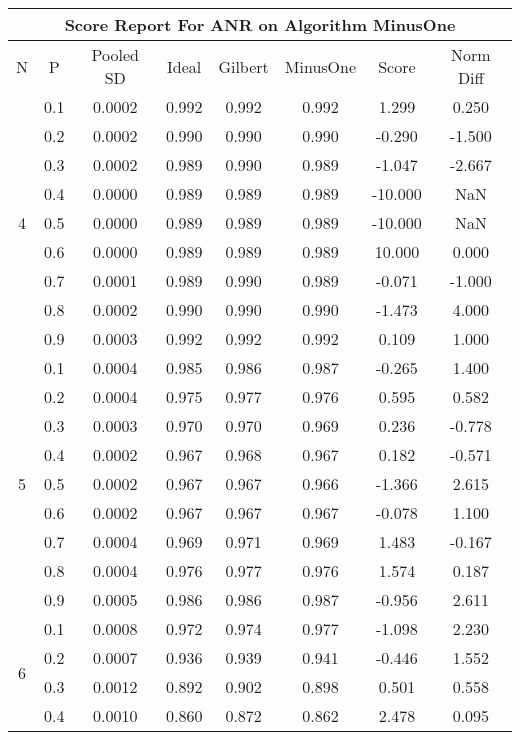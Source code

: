 \documentclass[11pt,a4paper]{report}
\begin{document}
\begin{longtable}{ | c | c || c | c | c | c | c | c | }
\hline
\multicolumn{8}{|c|}{ Score Report For ANR on Algorithm MinusOne} \\
\hline
N & P & Pooled SD &  Ideal &  Gilbert & MinusOne  & Score & Norm Diff \\
 \hline
 \hline
 \endhead
\multirow{9}{*}{4} & 0.1 & 0.0002 & 0.992 & 0.992 & 0.992 & 1.299 & 0.250 \\
 & 0.2 & 0.0002 & 0.990 & 0.990 & 0.990 & -0.290 & -1.500 \\
 & 0.3 & 0.0002 & 0.989 & 0.990 & 0.989 & -1.047 & -2.667 \\
 & 0.4 & 0.0000 & 0.989 & 0.989 & 0.989 & -10.000 & NaN \\
 & 0.5 & 0.0000 & 0.989 & 0.989 & 0.989 & -10.000 & NaN \\
 & 0.6 & 0.0000 & 0.989 & 0.989 & 0.989 & 10.000 & 0.000 \\
 & 0.7 & 0.0001 & 0.989 & 0.990 & 0.989 & -0.071 & -1.000 \\
 & 0.8 & 0.0002 & 0.990 & 0.990 & 0.990 & -1.473 & 4.000 \\
 & 0.9 & 0.0003 & 0.992 & 0.992 & 0.992 & 0.109 & 1.000 \\
 \hline
\multirow{9}{*}{5} & 0.1 & 0.0004 & 0.985 & 0.986 & 0.987 & -0.265 & 1.400 \\
 & 0.2 & 0.0004 & 0.975 & 0.977 & 0.976 & 0.595 & 0.582 \\
 & 0.3 & 0.0003 & 0.970 & 0.970 & 0.969 & 0.236 & -0.778 \\
 & 0.4 & 0.0002 & 0.967 & 0.968 & 0.967 & 0.182 & -0.571 \\
 & 0.5 & 0.0002 & 0.967 & 0.967 & 0.966 & -1.366 & 2.615 \\
 & 0.6 & 0.0002 & 0.967 & 0.967 & 0.967 & -0.078 & 1.100 \\
 & 0.7 & 0.0004 & 0.969 & 0.971 & 0.969 & 1.483 & -0.167 \\
 & 0.8 & 0.0004 & 0.976 & 0.977 & 0.976 & 1.574 & 0.187 \\
 & 0.9 & 0.0005 & 0.986 & 0.986 & 0.987 & -0.956 & 2.611 \\
 \hline
\multirow{9}{*}{6} & 0.1 & 0.0008 & 0.972 & 0.974 & 0.977 & -1.098 & 2.230 \\
 & 0.2 & 0.0007 & 0.936 & 0.939 & 0.941 & -0.446 & 1.552 \\
 & 0.3 & 0.0012 & 0.892 & 0.902 & 0.898 & 0.501 & 0.558 \\
 & 0.4 & 0.0010 & 0.860 & 0.872 & 0.862 & 2.478 & 0.095 \\

\end{longtable}
\end{document}
